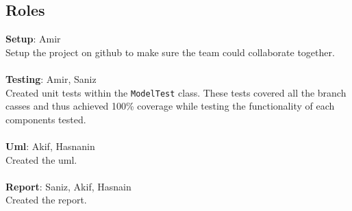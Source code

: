 \documentclass[12pt, dvipsnames, a4paper]{article}
\newcommand{\code}[1]{\texttt{#1}}
\begin{document}
\subsection{Roles}
\textbf{Setup}: Amir\\
Setup the project on github to make sure the team could collaborate together.\\ \\
\textbf{Testing}: Amir, Saniz\\
Created unit tests within the \code{ModelTest} class. These tests covered all the branch casses and thus
achieved 100\% coverage while testing the functionality of each components tested.\\ \\
\textbf{Uml}: Akif, Hasnanin\\
Created the uml.\\ \\
\textbf{Report}: Saniz, Akif, Hasnain\\
Created the report.
\end{document}
